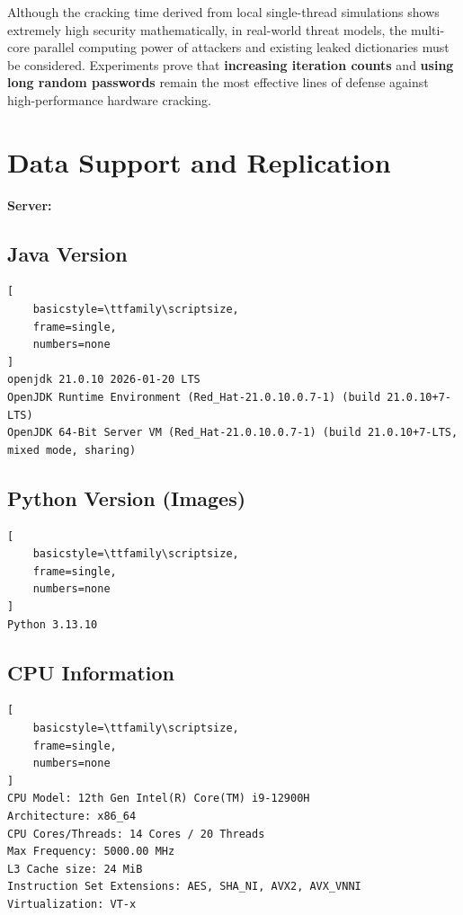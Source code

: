 \documentclass[12pt,a4paper]{article}
\begin{document}
Although the cracking time derived from local single-thread simulations shows extremely high security mathematically, in real-world threat models, the multi-core parallel computing power of attackers and existing leaked dictionaries must be considered. Experiments prove that \textbf{increasing iteration counts} and \textbf{using long random passwords} remain the most effective lines of defense against high-performance hardware cracking.

\appendix

\section{Data Support and Replication}

\textbf{Server:} 

\subsection{Java Version}

\begin{lstlisting}[
    basicstyle=\ttfamily\scriptsize, 
    frame=single,
    numbers=none
]
openjdk 21.0.10 2026-01-20 LTS
OpenJDK Runtime Environment (Red_Hat-21.0.10.0.7-1) (build 21.0.10+7-LTS)
OpenJDK 64-Bit Server VM (Red_Hat-21.0.10.0.7-1) (build 21.0.10+7-LTS, mixed mode, sharing)
\end{lstlisting}

\subsection{Python Version (Images)}


\begin{lstlisting}[
    basicstyle=\ttfamily\scriptsize, 
    frame=single,
    numbers=none
]
Python 3.13.10
\end{lstlisting}


\subsection{CPU Information}

\begin{lstlisting}[
    basicstyle=\ttfamily\scriptsize, 
    frame=single,
    numbers=none
]
CPU Model: 12th Gen Intel(R) Core(TM) i9-12900H
Architecture: x86_64
CPU Cores/Threads: 14 Cores / 20 Threads
Max Frequency: 5000.00 MHz
L3 Cache size: 24 MiB
Instruction Set Extensions: AES, SHA_NI, AVX2, AVX_VNNI
Virtualization: VT-x
\end{lstlisting}
\end{document}
